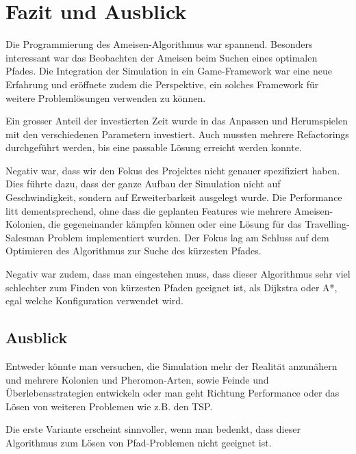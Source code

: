 
\chapter{Fazit und Ausblick}

Die Programmierung des Ameisen-Algorithmus war spannend. Besonders interessant war das Beobachten der Ameisen beim Suchen eines optimalen Pfades. Die Integration der Simulation in ein Game-Framework war eine neue Erfahrung und eröffnete zudem die Perspektive, ein solches Framework für weitere Problemlösungen verwenden zu können.

Ein grosser Anteil der investierten Zeit wurde in das Anpassen und Herumspielen mit den verschiedenen Parametern investiert. Auch mussten mehrere Refactorings durchgeführt werden, bis eine passable Lösung erreicht werden konnte.

Negativ war, dass wir den Fokus des Projektes nicht genauer spezifiziert haben. Dies führte dazu, dass der ganze Aufbau der Simulation nicht auf Geschwindigkeit, sondern auf Erweiterbarkeit ausgelegt wurde. Die Performance litt dementsprechend, ohne dass die geplanten Features wie mehrere Ameisen-Kolonien, die gegeneinander kämpfen können oder eine Lösung für das Travelling-Salesman Problem implementiert wurden. Der Fokus lag am Schluss auf dem Optimieren des Algorithmus zur Suche des kürzesten Pfades.

Negativ war zudem, dass man eingestehen muss, dass dieser Algorithmus sehr viel schlechter zum Finden von kürzesten Pfaden geeignet ist, als Dijkstra oder A*, egal welche Konfiguration verwendet wird.

\section{Ausblick}

Entweder könnte man versuchen, die Simulation mehr der Realität anzunähern und mehrere Kolonien und Pheromon-Arten, sowie Feinde und Überlebensstrategien entwickeln oder man geht Richtung Performance oder das Lösen von weiteren Problemen wie z.B. den TSP.

Die erste Variante erscheint sinnvoller, wenn man bedenkt, dass dieser Algorithmus zum Lösen von Pfad-Problemen nicht geeignet ist.


